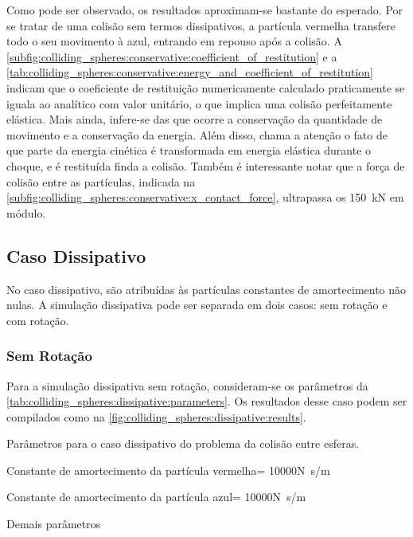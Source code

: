 Como pode ser observado, os resultados aproximam-se bastante do esperado. Por se tratar de uma colisão sem termos dissipativos, a partícula vermelha transfere todo o seu movimento à azul, entrando em repouso após a colisão. A \cref{subfig:colliding_spheres:conservative:coefficient_of_restitution} e a \cref{tab:colliding_spheres:conservative:energy_and_coefficient_of_restitution} indicam que o coeficiente de restituição numericamente calculado praticamente se iguala ao analítico com valor unitário, o que implica uma colisão perfeitamente elástica. Mais ainda, infere-se das   que ocorre a conservação da quantidade de movimento e a conservação da energia. Além disso, chama a atenção o fato de que parte da energia cinética é transformada em energia elástica durante o choque, e é restituída finda a colisão. Também é interessante notar que a força de colisão entre as partículas, indicada na \cref{subfig:colliding_spheres:conservative:x_contact_force}, ultrapassa os \SI{150}{\kilo\newton} em módulo.

\subsection{Caso Dissipativo} \label{sec:colliding_spheres:dissipative}

No caso dissipativo, são atribuídas às partículas constantes de amortecimento não nulas. A simulação dissipativa pode ser separada em dois casos: sem rotação e com rotação.

\subsubsection{Sem Rotação}

Para a simulação dissipativa sem rotação, consideram-se os parâmetros da \cref{tab:colliding_spheres:dissipative:parameters}. Os resultados desse caso podem ser compilados como na \cref{fig:colliding_spheres:dissipative:results}.

\begin{table}[h]
\centering
\caption{Parâmetros para o caso dissipativo do problema da colisão entre esferas.}
\label{tab:colliding_spheres:dissipative:parameters}
\begin{parametersdesc}{0.9\textwidth}
	\item{Constante de amortecimento da partícula vermelha}{\redNormalDampingConstant = 10000}{\si[per-mode=symbol]{\newton\second\per\meter}}
	\item{Constante de amortecimento da partícula azul}{\blueNormalDampingConstant = 10000}{\si[per-mode=symbol]{\newton\second\per\meter}}
	\item{Demais parâmetros}{}{}
\end{parametersdesc}
\sourceMe 
\end{table}


